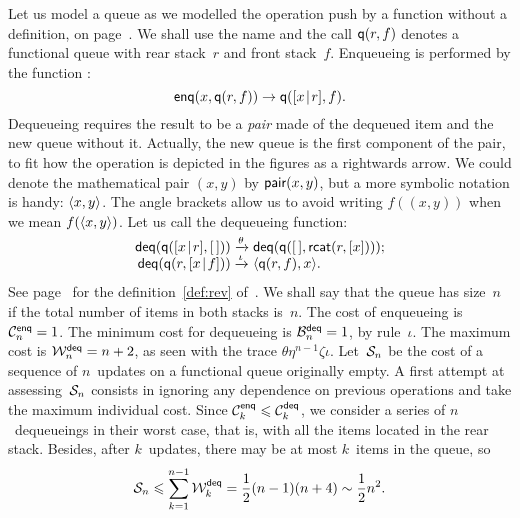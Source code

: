 Let us model a queue as we modelled the operation push by a function
 without a definition, on
page~\pageref{par:stacks}. We shall use the name
 and the call \(\fun{q}(r,f)\) denotes a
functional queue with rear stack~\(r\) and front
stack~\(f\). Enqueueing is performed by the function
:
\begin{equation}
\fun{enq}(x,\fun{q}(r,f)) \rightarrow \fun{q}(\cons{x}{r},f).
\label{def:enq}
\end{equation}
Dequeueing requires the result to be a \emph{pair} made of the dequeued item and the new queue without
it. Actually, the new queue is the first component of the pair, to fit
how the operation is depicted in the figures as a rightwards arrow. We
could denote the mathematical pair \((x,y)\) by \(\fun{pair}(x,y)\),
but a more symbolic notation is handy: \(\pair{x}{y}\). The angle
brackets allow us to avoid writing \(f((x,y))\) when we mean
\(f(\pair{x}{y})\). Let us call  the
dequeueing function:
\begin{equation}
\begin{array}{@{}r@{\;}l@{\;}l@{}}
  \fun{deq}(\fun{q}(\cons{x}{r},\el))
& \xrightarrow{\smash{\theta}}
& \fun{deq}(\fun{q}(\el,\fun{rcat}(r,[x])));\\
  \fun{deq}(\fun{q}(r,\cons{x}{f}))
& \xrightarrow{\smash{\iota}}
& \pair{\fun{q}(r,f)}{x}.
\end{array}
\label{def:deq}
\end{equation}
See page~\pageref{def:rev} for the definition~\eqref{def:rev}
of~. We shall say that the queue
has size~\(n\) if the total number of items in both stacks
is~\(n\). The cost of enqueueing is
\(\C{\fun{enq}}{n} = 1\). The minimum
cost for dequeueing is
\(\B{\fun{deq}}{n} = 1\), by rule~\(\iota\). The maximum cost is
\(\W{\fun{deq}}{n} = n+2\), as seen with the trace
\(\theta\eta^{n-1}\zeta\iota\). Let~\(\A{n}\) be the cost of a
sequence of \(n\)~updates on a functional queue originally empty. A
first attempt at assessing~\(\A{n}\) consists in ignoring any
dependence on previous operations and take the maximum individual
cost. Since \(\C{\fun{enq}}{k} \leqslant \C{\fun{deq}}{k}\), we
consider a series of \(n\)~dequeueings in their worst case, that is,
with all the items located in the rear stack. Besides, after
\(k\)~updates, there may be at most \(k\)~items in the queue, so
\begin{equation*}
\A{n} \leqslant \sum_{k=1}^{n-1}{\W{\fun{deq}}{k}} =
\frac{1}{2}{(n-1)(n+4)} \sim \frac{1}{2}{n^2}.
\end{equation*}

